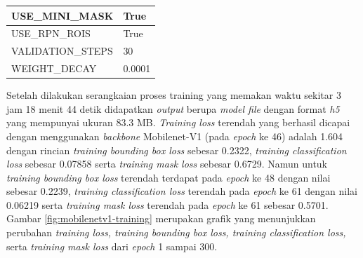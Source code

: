 \begin{longtable}[h]{|l|l|}
	USE\_MINI\_MASK                 & True                                                                                                                                                                                   \\ \hline
	USE\_RPN\_ROIS                  & True                                                                                                                                                                                   \\ \hline
	VALIDATION\_STEPS               & 30                                                                                                                                                                                     \\ \hline
	WEIGHT\_DECAY                   & 0.0001                                                                                                                                                                                 \\ \hline
\end{longtable}

Setelah dilakukan serangkaian proses training yang memakan waktu sekitar 3 jam 18 menit 44 detik didapatkan \textit{output} berupa \textit{model file}  dengan format \textit{h5} yang mempunyai ukuran 83.3 MB. \textit{Training loss} terendah yang berhasil dicapai dengan menggunakan \textit{backbone} Mobilenet-V1 (pada \textit{epoch} ke 46) adalah 1.604 dengan rincian \textit{training bounding box loss} sebesar 0.2322, \textit{training classification loss} sebesar 0.07858 serta \textit{training mask loss} sebesar 0.6729. Namun untuk \textit{training bounding box loss} terendah terdapat pada \textit{epoch} ke 48 dengan nilai sebesar 0.2239, \textit{training classification loss} terendah pada \textit{epoch} ke 61 dengan nilai 0.06219 serta \textit{training mask loss} terendah pada \textit{epoch} ke 61 sebesar 0.5701. Gambar \ref{fig:mobilenetv1-training} merupakan grafik yang menunjukkan perubahan \textit{training loss, training bounding box loss, training classification loss,} serta \textit{training mask loss} dari \textit{epoch} 1 sampai 300. 

